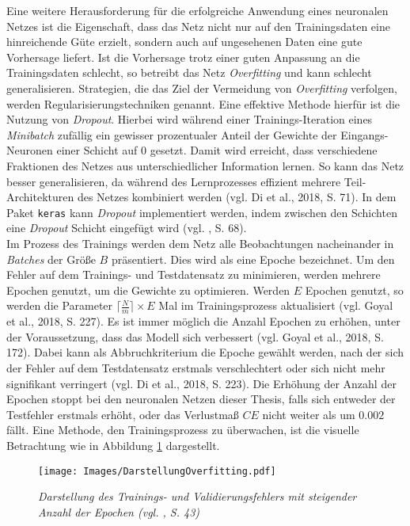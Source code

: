 \documentclass[a4paper,11pt]{article}
\begin{document}
Eine weitere Herausforderung für die erfolgreiche Anwendung eines neuronalen Netzes ist die Eigenschaft, dass das Netz nicht nur auf den Trainingsdaten eine hinreichende Güte erzielt, sondern auch auf ungesehenen Daten eine gute Vorhersage liefert. Ist die Vorhersage trotz einer guten Anpassung an die Trainingsdaten schlecht, so betreibt das Netz \textit{Overfitting} und kann schlecht generalisieren. Strategien, die das Ziel der Vermeidung von \textit{Overfitting} verfolgen, werden Regularisierungstechniken genannt. Eine effektive Methode hierfür ist die Nutzung von \textit{Dropout}. Hierbei wird während einer Trainings-Iteration eines \textit{Minibatch} zufällig ein gewisser prozentualer Anteil der Gewichte der Eingangs-Neuronen einer Schicht auf $0$ gesetzt. Damit wird erreicht, dass verschiedene Fraktionen des Netzes aus unterschiedlicher Information lernen. So kann das Netz besser generalisieren, da während des Lernprozesses effizient mehrere Teil-Architekturen des Netzes kombiniert werden (vgl. Di et al., 2018, S. 71). In dem Paket \texttt{keras} kann \textit{Dropout} implementiert werden, indem zwischen den Schichten eine \textit{Dropout} Schicht eingefügt wird (vgl. \cite{keras}, S. 68).\\
Im Prozess des Trainings werden dem Netz alle Beobachtungen nacheinander in \textit{Batches} der Größe $B$ präsentiert. Dies wird als eine Epoche bezeichnet. Um den Fehler auf dem Trainings- und Testdatensatz zu minimieren, werden mehrere Epochen genutzt, um die Gewichte zu optimieren. Werden $E$ Epochen genutzt, so werden die Parameter $\lceil \frac{N}{m} \rceil \times E$ Mal im Trainingsprozess aktualisiert (vgl. Goyal et al., 2018, S. 227). Es ist immer möglich die Anzahl Epochen zu erhöhen, unter der Voraussetzung, dass das Modell sich verbessert (vgl. Goyal et al., 2018, S. 172). Dabei kann als Abbruchkriterium die Epoche gewählt werden, nach der sich der Fehler auf dem Testdatensatz erstmals verschlechtert oder sich nicht mehr signifikant verringert (vgl. Di et al., 2018, S. 223). Die Erhöhung der Anzahl der Epochen stoppt bei den neuronalen Netzen dieser Thesis, falls sich entweder der  Testfehler erstmals erhöht, oder das Verlustmaß $CE$ nicht weiter als um $0.002$ fällt. Eine Methode, den Trainingsprozess zu überwachen, ist die visuelle Betrachtung wie in Abbildung \ref{abb:overfitting} dargestellt.

\begin{figure}[!ht]
\begin{center}
\texttt{[image: Images/DarstellungOverfitting.pdf]}
\caption{\textit{Darstellung des Trainings- und Validierungsfehlers mit steigender Anzahl der Epochen (vgl. \cite{keras}, S. 43)}}
\label{abb:overfitting}
\end{center}
\end{figure}
\end{document}
